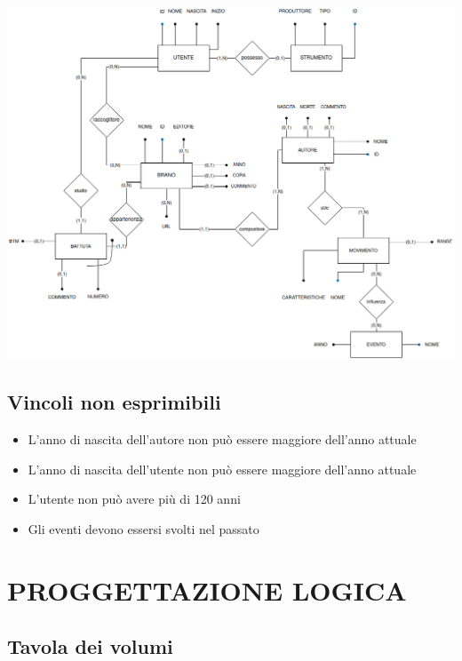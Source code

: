 \documentclass{article}
\begin{document}
    \begin{center}
        \includegraphics[width=\linewidth]{immagini/01_diagrammaER.png}   %
    \end{center}

    \subsection{Vincoli non esprimibili}

    \begin{itemize}
        \item L'anno di nascita dell'autore non può essere maggiore dell'anno attuale
        \item L'anno di nascita dell'utente non può essere maggiore dell'anno attuale
        \item L'utente non può avere più di 120 anni
        \item Gli eventi devono essersi svolti nel passato
    \end{itemize}

    \section{PROGGETTAZIONE LOGICA}

    \subsection{Tavola dei volumi}
\end{document}
